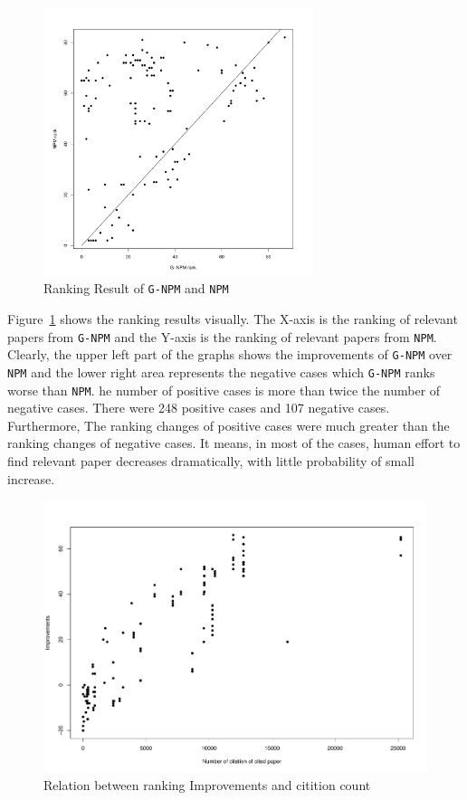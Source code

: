\documentclass{llncs}
\newcommand{\name}{\texttt{G-NPM}\xspace}
\newcommand{\npm}{\texttt{NPM}\xspace}
\begin{document}
\begin{figure}[ht]
\centering
\includegraphics[width= 0.7\textwidth]{rq1.pdf}
\caption{Ranking Result of \name and \npm \label{fig:rq1}}
\end{figure}

Figure~\ref{fig:rq1} shows the ranking results visually. The X-axis is the ranking of relevant papers from \name and the Y-axis is the ranking of relevant papers from \npm. Clearly, the upper left part of the graphs shows the improvements of \name over \npm and the lower right area represents the negative cases which \name ranks worse than \npm. he number of positive cases is more than twice the number of negative cases. There were 248 positive cases and 107 negative cases. Furthermore, The ranking changes of positive cases were much greater than the ranking changes of negative cases. It means, in most of the cases, human effort to find relevant paper decreases dramatically, with little probability of small increase.

\begin{figure}[ht]
\centering
\includegraphics[width= \textwidth]{rq1_2.pdf}
\caption{Relation between ranking Improvements and citition count \label{fig:rq1_2}}
\end{figure}
\end{document}
